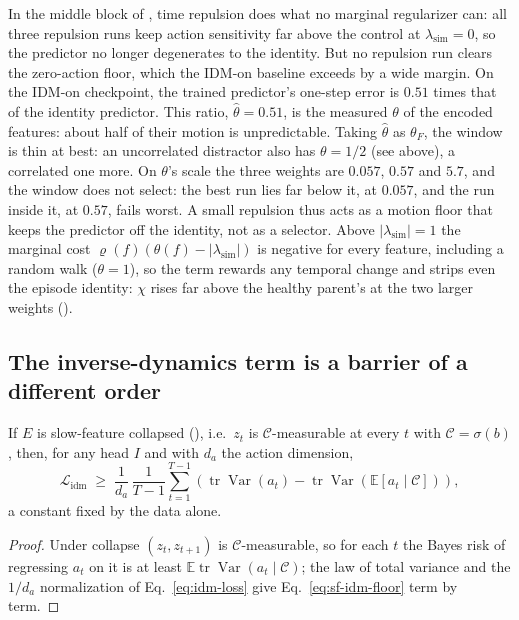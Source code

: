 In the middle block of , time repulsion does what no marginal regularizer can: all three repulsion runs keep action sensitivity far above the control at $\lambda_{\mathrm{sim}} = 0$, so the predictor no longer degenerates to the identity. But no repulsion run clears the zero-action floor, which the IDM-on baseline exceeds by a wide margin. On the IDM-on checkpoint, the trained predictor's one-step error is $0.51$ times that of the identity predictor. This ratio, $\hat\theta = 0.51$, is the measured $\theta$ of the encoded features: about half of their motion is unpredictable. Taking $\hat\theta$ as $\theta_F$, the window is thin at best: an uncorrelated distractor also has $\theta = 1/2$ (see above), a correlated one more. On $\theta$'s scale the three weights are $0.057$, $0.57$ and $5.7$, and the window does not select: the best run lies far below it, at $0.057$, and the run inside it, at $0.57$, fails worst. A small repulsion thus acts as a motion floor that keeps the predictor off the identity, not as a selector. Above $|\lambda_{\mathrm{sim}}| = 1$ the marginal cost $\varrho(f)(\theta(f)-|\lambda_{\mathrm{sim}}|)$ is negative for every feature, including a random walk ($\theta = 1$), so the term rewards any temporal change and strips even the episode identity: $\chi$ rises far above the healthy parent's at the two larger weights ().

\subsection{The inverse-dynamics term is a barrier of a different order}
\label{app:sf-idm}

\begin{proposition}
\label{prop:sf-idm}
If $E$ is slow-feature collapsed (), i.e.\ $z_t$ is
$\mathcal{C}$-measurable at every $t$ with $\mathcal{C} = \sigma(b)$, then, for any head $I$
and with $d_a$ the action dimension,
\begin{equation}
\label{eq:sf-idm-floor}
\mathcal{L}_{\mathrm{idm}} \;\geq\; \frac{1}{d_a}\,\frac{1}{T-1}\sum_{t=1}^{T-1}
\left(\operatorname{tr}\operatorname{Var}(a_t) - \operatorname{tr}\operatorname{Var}\!\left(\mathbb{E}[a_t\mid\mathcal{C}]\right)\right),
\end{equation}
a constant fixed by the data alone.
\end{proposition}

\begin{proof}
Under collapse $(z_t,z_{t+1})$ is $\mathcal{C}$-measurable, so for each $t$ the Bayes risk of regressing
$a_t$ on it is at least $\mathbb{E}\operatorname{tr}\operatorname{Var}(a_t\mid\mathcal{C})$; the law of total variance
and the $1/d_a$ normalization of Eq.~\eqref{eq:idm-loss} give Eq.~\eqref{eq:sf-idm-floor} term by term.
\end{proof}

